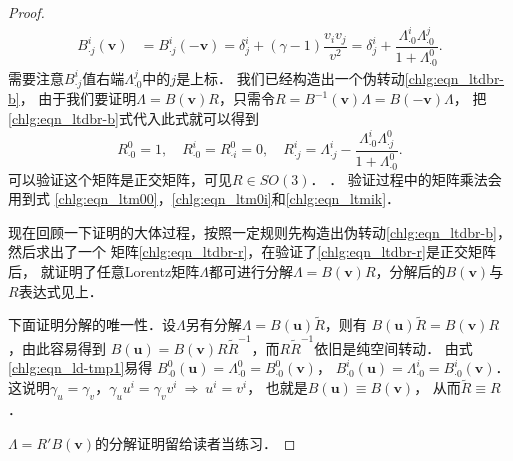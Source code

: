 \begin{proof}
\begin{equation}
\begin{aligned}
            B^{i}_{\cdot j}(\boldsymbol{v}) &= B^{i}_{\cdot j}(-\boldsymbol{v}) =
            \delta^i_j + (\gamma-1)\dfrac{v_i v_j}{v^2} =
            \delta^i_j + \dfrac{\Lambda ^{i}_{\cdot 0}\Lambda ^{j}_{\cdot 0}}
            {1 + \Lambda ^{0}_{\cdot 0} } .
        \end{aligned}
    \end{equation}
    需要注意$B^{i}_{\cdot j}$值右端$\Lambda ^{j}_{\cdot 0}$中的$j$是上标．
    我们已经构造出一个伪转动\eqref{chlg:eqn_ltdbr-b}，
    由于我们要证明$\Lambda=B(\boldsymbol{v})R$，只需令$R =B^{-1}(\boldsymbol{v})\Lambda=B(-\boldsymbol{v})\Lambda $，
    把\eqref{chlg:eqn_ltdbr-b}式代入此式就可以得到
    \begin{equation}\label{chlg:eqn_ltdbr-r}
        R^{0}_{\cdot 0} = 1, \quad    R^{i}_{\cdot 0} = R^{0}_{\cdot i} = 0, \quad
        R^{i}_{\cdot j} = \Lambda^i_{\cdot j} - \dfrac{\Lambda ^{i}_{\cdot 0}
            \Lambda ^{0}_{\cdot j}}{1 + \Lambda ^{0}_{\cdot 0} }.
    \end{equation}
    可以验证这个矩阵是正交矩阵，可见$R\in SO(3)$．
    ．
    验证过程中的矩阵乘法会用到式
    \eqref{chlg:eqn_ltm00}，\eqref{chlg:eqn_ltm0i}和\eqref{chlg:eqn_ltmik}．
    
    现在回顾一下证明的大体过程，按照一定规则先构造出伪转动\eqref{chlg:eqn_ltdbr-b}，然后求出了一个
    矩阵\eqref{chlg:eqn_ltdbr-r}，在验证了\eqref{chlg:eqn_ltdbr-r}是正交矩阵后，
    就证明了任意Lorentz矩阵$\Lambda$都可进行分解$\Lambda=B(\boldsymbol{v})R$，分解后的$B(\boldsymbol{v})$与$R$表达式见上．
    
    下面证明分解的唯一性．设$\Lambda$另有分解$\Lambda={B}(\boldsymbol{u})\tilde{R}$，则有
    ${B}(\boldsymbol{u})\tilde{R}=B(\boldsymbol{v})R$，由此容易得到
    ${B}(\boldsymbol{u})=B(\boldsymbol{v})R\tilde{R}^{-1}$，而$R\tilde{R}^{-1}$依旧是纯空间转动．
    由式\eqref{chlg:eqn_ld-tmp1}易得
    ${B}^{0}_{\cdot 0}(\boldsymbol{u})= \Lambda^0_{\cdot 0}=B^{0}_{\cdot 0}(\boldsymbol{v})$，
    ${B}^{i}_{\cdot 0}(\boldsymbol{u})= {\Lambda^i_{\cdot 0}} =B^{i}_{\cdot 0}(\boldsymbol{v})$．
    这说明$\gamma_u =\gamma_v$，$\gamma_u u^i=\gamma_v v^i{\  \Rightarrow \  } u^i=v^i$，
    也就是${B}(\boldsymbol{u}) \equiv B(\boldsymbol{v})$，    从而$\tilde{R}\equiv R$．
    
    
    $\Lambda = R'B(\boldsymbol{v})$的分解证明留给读者当练习．
\end{proof}

